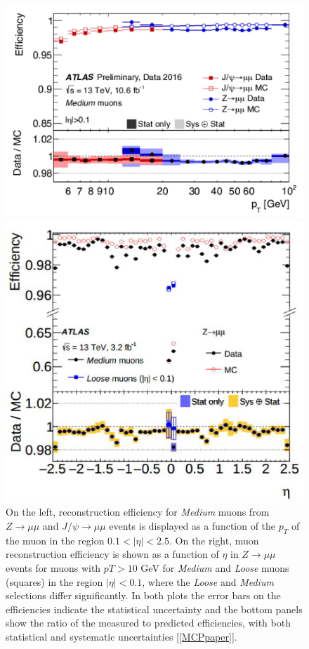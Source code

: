 \begin{figure}[!h]
  \centering
  \begin{minipage}[b]{0.5\textwidth}
    \includegraphics[width=\textwidth]{Pictures/efficiencyoverpt.PNG}
  \end{minipage}
  \hspace{.5cm}
  \begin{minipage}[b]{0.4\textwidth}
    \includegraphics[width=\textwidth]{Pictures/efficiencyovereta.PNG}
  \end{minipage}
  \caption{On the left, reconstruction efficiency for \textit{Medium} muons from $Z \rightarrow \mu\mu$ and $J/\psi \rightarrow \mu\mu$ events is displayed as a function of the $p_T$ of the muon in the region $0.1 < |\eta| < 2.5$.  On the right, muon reconstruction efficiency is shown as a function of $\eta$ in $Z \rightarrow \mu\mu$ events for muons with $pT > 10$ GeV for \textit{Medium} and \textit{Loose} muons (squares) in the region $|\eta| < 0.1$, where the \textit{Loose} and \textit{Medium} selections differ significantly. In both plots the error bars on the efficiencies indicate the statistical uncertainty and the bottom panels show the ratio of the measured to predicted efficiencies, with both statistical and systematic uncertainties [\ref{MCPpaper}].}

\end{figure}
